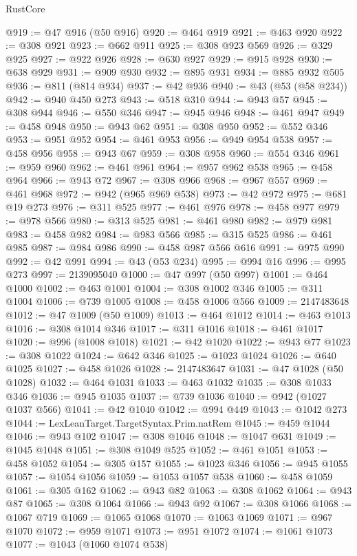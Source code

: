 \begin{lexlean}{RustCore}
\begin{coremodule}
@919 := @47 @916 (@50 @916)
@920 := @464 @919
@921 := @463 @920
@922 := @308 @921
@923 := @662 @911
@925 := @308 @923 @569
@926 := @329 @925
@927 := @922 @926
@928 := @630 @927
@929 := @915 @928
@930 := @638 @929
@931 := @909 @930
@932 := @895 @931
@934 := @885 @932 @505
@936 := @811 (@814 @934)
@937 := @42 @936
@940 := @43 (@53 (@58 @234))
@942 := @940 @450 @273
@943 := @518 @310
@944 := @943 @57
@945 := @308 @944
@946 := @550 @346
@947 := @945 @946
@948 := @461 @947
@949 := @458 @948
@950 := @943 @62
@951 := @308 @950
@952 := @552 @346
@953 := @951 @952
@954 := @461 @953
@956 := @949 @954 @538
@957 := @458 @956
@958 := @943 @67
@959 := @308 @958
@960 := @554 @346
@961 := @959 @960
@962 := @461 @961
@964 := @957 @962 @538
@965 := @458 @964
@966 := @943 @72
@967 := @308 @966
@968 := @967 @557
@969 := @461 @968
@972 := @942 (@965 @969 @538)
@973 := @42 @972
@975 := @681 @19 @273
@976 := @311 @525
@977 := @461 @976
@978 := @458 @977
@979 := @978 @566
@980 := @313 @525
@981 := @461 @980
@982 := @979 @981
@983 := @458 @982
@984 := @983 @566
@985 := @315 @525
@986 := @461 @985
@987 := @984 @986
@990 := @458 @987 @566 @616
@991 := @975 @990
@992 := @42 @991
@994 := @43 (@53 @234)
@995 := @994 @16
@996 := @995 @273
@997 := 2139095040
@1000 := @47 @997 (@50 @997)
@1001 := @464 @1000
@1002 := @463 @1001
@1004 := @308 @1002 @346
@1005 := @311 @1004
@1006 := @739 @1005
@1008 := @458 @1006 @566
@1009 := 2147483648
@1012 := @47 @1009 (@50 @1009)
@1013 := @464 @1012
@1014 := @463 @1013
@1016 := @308 @1014 @346
@1017 := @311 @1016
@1018 := @461 @1017
@1020 := @996 (@1008 @1018)
@1021 := @42 @1020
@1022 := @943 @77
@1023 := @308 @1022
@1024 := @642 @346
@1025 := @1023 @1024
@1026 := @640 @1025
@1027 := @458 @1026
@1028 := 2147483647
@1031 := @47 @1028 (@50 @1028)
@1032 := @464 @1031
@1033 := @463 @1032
@1035 := @308 @1033 @346
@1036 := @945 @1035
@1037 := @739 @1036
@1040 := @942 (@1027 @1037 @566)
@1041 := @42 @1040
@1042 := @994 @449
@1043 := @1042 @273
@1044 := LexLeanTarget.TargetSyntax.Prim.natRem
@1045 := @459 @1044
@1046 := @943 @102
@1047 := @308 @1046
@1048 := @1047 @631
@1049 := @1045 @1048
@1051 := @308 @1049 @525
@1052 := @461 @1051
@1053 := @458 @1052
@1054 := @305 @157
@1055 := @1023 @346
@1056 := @945 @1055
@1057 := @1054 @1056
@1059 := @1053 @1057 @538
@1060 := @458 @1059
@1061 := @305 @162
@1062 := @943 @82
@1063 := @308 @1062
@1064 := @943 @87
@1065 := @308 @1064
@1066 := @943 @92
@1067 := @308 @1066
@1068 := @1067 @719
@1069 := @1065 @1068
@1070 := @1063 @1069
@1071 := @967 @1070
@1072 := @959 @1071
@1073 := @951 @1072
@1074 := @1061 @1073
@1077 := @1043 (@1060 @1074 @538)

\end{coremodule}
\end{lexlean}
